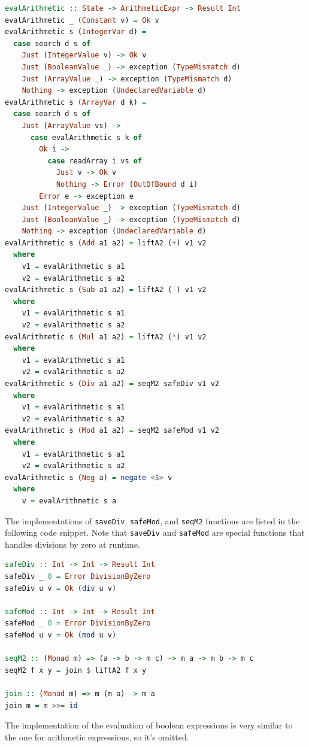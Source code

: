 \documentclass[12pt,a4paper]{article}
\begin{document}
\begin{lstlisting}[language=Haskell, style=custom-style]
evalArithmetic :: State -> ArithmeticExpr -> Result Int
evalArithmetic _ (Constant v) = Ok v
evalArithmetic s (IntegerVar d) =
  case search d s of
    Just (IntegerValue v) -> Ok v
    Just (BooleanValue _) -> exception (TypeMismatch d)
    Just (ArrayValue _) -> exception (TypeMismatch d)
    Nothing -> exception (UndeclaredVariable d)
evalArithmetic s (ArrayVar d k) =
  case search d s of
    Just (ArrayValue vs) ->
      case evalArithmetic s k of
        Ok i ->
          case readArray i vs of
            Just v -> Ok v
            Nothing -> Error (OutOfBound d i)
        Error e -> exception e
    Just (IntegerValue _) -> exception (TypeMismatch d)
    Just (BooleanValue _) -> exception (TypeMismatch d)
    Nothing -> exception (UndeclaredVariable d)
evalArithmetic s (Add a1 a2) = liftA2 (+) v1 v2
  where
    v1 = evalArithmetic s a1
    v2 = evalArithmetic s a2
evalArithmetic s (Sub a1 a2) = liftA2 (-) v1 v2
  where
    v1 = evalArithmetic s a1
    v2 = evalArithmetic s a2
evalArithmetic s (Mul a1 a2) = liftA2 (*) v1 v2
  where
    v1 = evalArithmetic s a1
    v2 = evalArithmetic s a2
evalArithmetic s (Div a1 a2) = seqM2 safeDiv v1 v2
  where
    v1 = evalArithmetic s a1
    v2 = evalArithmetic s a2
evalArithmetic s (Mod a1 a2) = seqM2 safeMod v1 v2
  where
    v1 = evalArithmetic s a1
    v2 = evalArithmetic s a2
evalArithmetic s (Neg a) = negate <$> v
  where
    v = evalArithmetic s a
\end{lstlisting}
The implementations of \texttt{saveDiv}, \texttt{safeMod}, and \texttt{seqM2} functions are listed in the following code snippet.
Note that \texttt{saveDiv} and \texttt{safeMod} are special functions that handles divisions by zero at runtime.
\begin{lstlisting}[language=Haskell, style=custom-style]
safeDiv :: Int -> Int -> Result Int
safeDiv _ 0 = Error DivisionByZero
safeDiv u v = Ok (div u v)

safeMod :: Int -> Int -> Result Int
safeMod _ 0 = Error DivisionByZero
safeMod u v = Ok (mod u v)

seqM2 :: (Monad m) => (a -> b -> m c) -> m a -> m b -> m c
seqM2 f x y = join $ liftA2 f x y

join :: (Monad m) => m (m a) -> m a
join m = m >>= id
\end{lstlisting}
The implementation of the evaluation of boolean expressions is very similar to the one for arithmetic expressions, so it's omitted.
\end{document}
